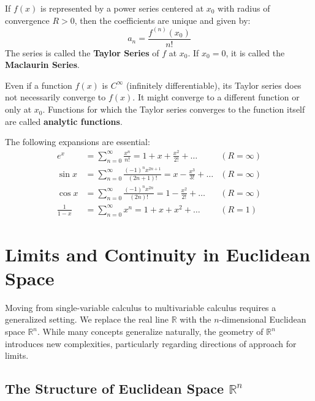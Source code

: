 \documentclass[oneside]{book}
\begin{document}
\begin{theorem}
If $f(x)$ is represented by a power series centered at $x_0$ with radius of convergence $R > 0$, then the coefficients are unique and given by:
\[ a_n = \frac{f^{(n)}(x_0)}{n!} \]
The series is called the \textbf{Taylor Series} of $f$ at $x_0$. If $x_0=0$, it is called the \textbf{Maclaurin Series}.
\end{theorem}

\begin{remark}
Even if a function $f(x)$ is $C^\infty$ (infinitely differentiable), its Taylor series does not necessarily converge to $f(x)$. It might converge to a different function or only at $x_0$.
Functions for which the Taylor series converges to the function itself are called \textbf{analytic functions}.
\end{remark}

\begin{example}
The following expansions are essential:
\begin{align*}
    e^x &= \sum_{n=0}^{\infty} \frac{x^n}{n!} = 1 + x + \frac{x^2}{2!} + \dots & (R = \infty) \\
    \sin x &= \sum_{n=0}^{\infty} \frac{(-1)^n x^{2n+1}}{(2n+1)!} = x - \frac{x^3}{3!} + \dots & (R = \infty) \\
    \cos x &= \sum_{n=0}^{\infty} \frac{(-1)^n x^{2n}}{(2n)!} = 1 - \frac{x^2}{2!} + \dots & (R = \infty) \\
    \frac{1}{1-x} &= \sum_{n=0}^{\infty} x^n = 1 + x + x^2 + \dots & (R = 1)
\end{align*}
\end{example}

\section{Limits and Continuity in Euclidean Space}

Moving from single-variable calculus to multivariable calculus requires a generalized setting. We replace the real line $\mathbb{R}$ with the $n$-dimensional Euclidean space $\mathbb{R}^n$. While many concepts generalize naturally, the geometry of $\mathbb{R}^n$ introduces new complexities, particularly regarding directions of approach for limits.

\subsection{The Structure of Euclidean Space $\mathbb{R}^n$}
\end{document}
